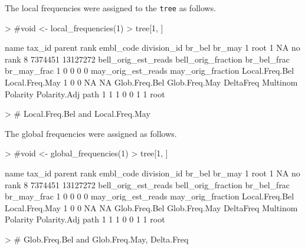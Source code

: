 \documentclass{article}
\begin{document}
The local frequencies were assigned to the {\tt tree} as follows.
\begin{Schunk}
\begin{Sinput}
> #void <- local_frequencies(1)
> tree[1, ]
\end{Sinput}
\begin{Soutput}
  name tax_id parent    rank embl_code division_id  br_bel   br_may
1 root      1     NA no rank                     8 7374451 13127272
  bell_orig_est_reads bell_orig_fraction br_bel_frac br_may_frac
1                   0                  0           0           0
  may_orig_est_reads may_orig_fraction Local.Freq.Bel Local.Freq.May
1                  0                 0             NA             NA
  Glob.Freq.Bel Glob.Freq.May DeltaFreq Multinom Polarity Polarity.Adj path
1             1             1         0        0        1            1 root
\end{Soutput}
\begin{Sinput}
> # Local.Freq.Bel and Local.Freq.May
\end{Sinput}
\end{Schunk}
The global frequencies were assigned as follows.
\begin{Schunk}
\begin{Sinput}
> #void <- global_frequencies(1)
> tree[1, ]
\end{Sinput}
\begin{Soutput}
  name tax_id parent    rank embl_code division_id  br_bel   br_may
1 root      1     NA no rank                     8 7374451 13127272
  bell_orig_est_reads bell_orig_fraction br_bel_frac br_may_frac
1                   0                  0           0           0
  may_orig_est_reads may_orig_fraction Local.Freq.Bel Local.Freq.May
1                  0                 0             NA             NA
  Glob.Freq.Bel Glob.Freq.May DeltaFreq Multinom Polarity Polarity.Adj path
1             1             1         0        0        1            1 root
\end{Soutput}
\begin{Sinput}
> # Glob.Freq.Bel and Glob.Freq.May, Delta.Freq
\end{Sinput}
\end{Schunk}
\end{document}
